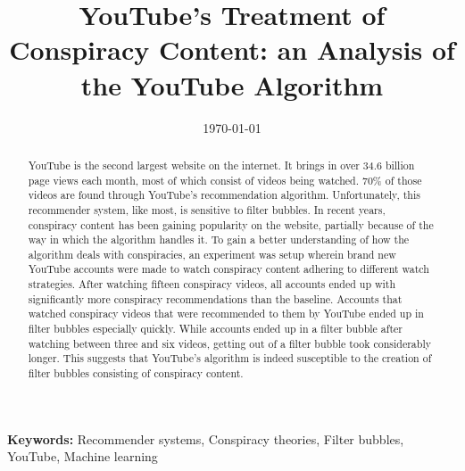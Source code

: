 \documentclass{uva-inf-article}
\title{YouTube's Treatment of Conspiracy Content: an Analysis of the YouTube Algorithm}
\date{\today}
\begin{document}
\maketitle

\begin{abstract}
    YouTube is the second largest website on the internet. It brings in over 34.6 billion page views each month,
    most of which consist of videos being watched. 70\% of those videos are found through YouTube's 
    recommendation algorithm. Unfortunately, this recommender system, like most, is sensitive to filter bubbles.
    In recent years, conspiracy content has been gaining popularity on the website, partially because of the way
    in which the algorithm handles it. To gain a better understanding of how the algorithm deals with
    conspiracies, an experiment was setup wherein brand new YouTube accounts were made to watch conspiracy
    content adhering to different watch strategies. After watching fifteen conspiracy videos, all accounts ended
    up with significantly more conspiracy recommendations than the baseline. Accounts that watched conspiracy 
    videos that were recommended to them by YouTube ended up in filter bubbles especially quickly. While
    accounts ended up in a filter bubble after watching between three and six videos, getting out of a filter
    bubble took considerably longer. This suggests that YouTube's algorithm is indeed susceptible to the
    creation of filter bubbles consisting of conspiracy content. 
\end{abstract}

{\bf Keywords:} Recommender systems, Conspiracy theories, Filter bubbles, YouTube, Machine learning

\linenumbers













\newpage

\nolinenumbers
 

\newpage


\end{document}
